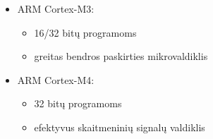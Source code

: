 \documentclass[a4paper, 12pt]{article} %
\begin{document}
\begin{onehalfspacing}
\begin{itemize}
\begin{itemize}
\item ARM Cortex-M3:
\begin{itemize}
\item 16/32 bit\k{u} programoms
\item greitas bendros paskirties mikrovaldiklis
\end{itemize}
\item ARM Cortex-M4:
\begin{itemize}
\item 32 bit\k{u} programoms
\item efektyvus skaitmenini\k{u} signal\k{u} valdiklis
\end{itemize}
\end{itemize}
\end{itemize}




\end{onehalfspacing}
\end{document}
